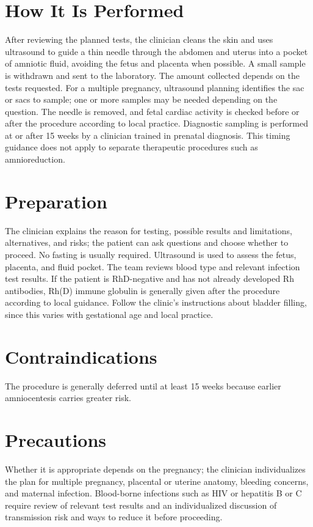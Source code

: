 \section*{How It Is Performed}
After reviewing the planned tests, the clinician cleans the skin and uses ultrasound to guide a thin needle through the abdomen and uterus into a pocket of amniotic fluid, avoiding the fetus and placenta when possible. A small sample is withdrawn and sent to the laboratory. The amount collected depends on the tests requested. For a multiple pregnancy, ultrasound planning identifies the sac or sacs to sample; one or more samples may be needed depending on the question. The needle is removed, and fetal cardiac activity is checked before or after the procedure according to local practice. Diagnostic sampling is performed at or after 15 weeks by a clinician trained in prenatal diagnosis. This timing guidance does not apply to separate therapeutic procedures such as amnioreduction.

\section*{Preparation}
The clinician explains the reason for testing, possible results and limitations, alternatives, and risks; the patient can ask questions and choose whether to proceed. No fasting is usually required. Ultrasound is used to assess the fetus, placenta, and fluid pocket. The team reviews blood type and relevant infection test results. If the patient is RhD-negative and has not already developed Rh antibodies, Rh(D) immune globulin is generally given after the procedure according to local guidance. Follow the clinic's instructions about bladder filling, since this varies with gestational age and local practice.

\section*{Contraindications}
The procedure is generally deferred until at least 15 weeks because earlier amniocentesis carries greater risk.

\section*{Precautions}
Whether it is appropriate depends on the pregnancy; the clinician individualizes the plan for multiple pregnancy, placental or uterine anatomy, bleeding concerns, and maternal infection. Blood-borne infections such as HIV or hepatitis B or C require review of relevant test results and an individualized discussion of transmission risk and ways to reduce it before proceeding.

